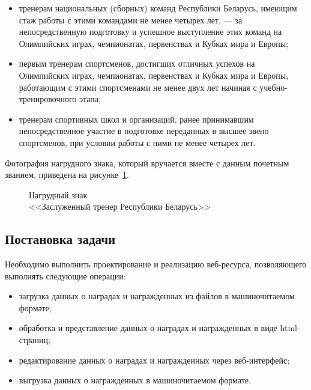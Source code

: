 \begin{itemize}
\item
  тренерам национальных (сборных) команд Республики Беларусь,
  имеющим стаж работы с этими командами не менее четырех лет,
  --- за непосредственную подготовку и успешное выступление этих команд
  на Олимпийских играх, чемпионатах, первенствах и Кубках мира и Европы;
\item
  первым тренерам спортсменов, достигших отличных успехов
  на Олимпийских играх, чемпионатах, первенствах и Кубках мира и Европы,
  работающим с этими спортсменами не менее двух лет начиная
  с учебно-тренировочного этапа;
\item
  тренерам спортивных школ и организаций, ранее принимавшим
  непосредственное участие в подготовке переданных в высшее
  звено спортсменов, при условии работы с ними не менее четырех лет.
\end{itemize}

Фотография нагрудного знака, 
который вручается вместе с данным почетным званием, 
приведена на рисунке~\ref{fig:trener_belarus}.

\begin{figure}[h]
  \centering
  {
    \setlength{\fboxsep}{0pt}%
    \setlength{\fboxrule}{1pt}%
  }
  \caption{Нагрудный знак \\ <<Заслуженный тренер Республики Беларусь>>}
  \label{fig:trener_belarus}
\end{figure}


\subsection{Постановка задачи}

Необходимо выполнить проектирование и реализацию веб-ресурса, 
позволяющего выполнять следующие операции:
\begin{itemize}
\item загрузка данных о наградах и награжденных из файлов
  в машиночитаемом формате;
\item обработка и представление данных о наградах и награжденных
  в виде html-страниц;
\item редактирование данных о наградах и награжденных 
  через веб-интерфейс;
\item выгрузка данных о награжденных в машиночитаемом 
  формате.
\end{itemize}

